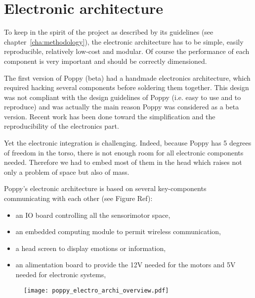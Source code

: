 
\section{Electronic architecture} %
\label{sec:poppy-electronic}

To keep in the spirit of the project as described by its guidelines (see chapter~\ref{cha:methodology}), the electronic architecture has to be simple, easily reproducible, relatively low-cost and modular. Of course the performance of each component is very important and should be correctly dimensioned.

The first version of Poppy (beta) had a handmade electronics architecture, which required hacking several components before soldering them together. This design was not compliant with the design guidelines of Poppy (i.e. easy to use and to reproduce) and was actually the main reason Poppy was considered as a beta version. Recent work has been done toward the simplification and the reproducibility of the electronics part.

Yet the electronic integration is challenging. Indeed, because Poppy has 5 degrees of freedom in the torso, there is not enough room for all electronic components needed. Therefore we had to embed most of them in the head which raises not only a problem of space but also of mass.

Poppy's electronic architecture is based on several key-components communicating with each other (see Figure Ref):
\begin{itemize}
    \item an IO board controlling all the sensorimotor space,
    \item an embedded computing module to permit wireless communication,
    \item a head screen to display emotions or information,
    \item an alimentation board to provide the 12V needed for the motors and 5V needed for electronic systems,
\end{itemize}

\begin{figure}[tb]
    \begin{center}
        \texttt{[image: poppy\_electro\_archi\_overview.pdf]}
    \end{center}
    \caption{}

\end{figure}

